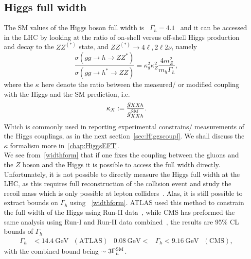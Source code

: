 \subsection{Higgs full width}
The SM values of the Higgs boson full width is ~$\Gamma_h=4.1$ \GeV\, and it can be accessed in the LHC by looking at the ratio of on-shell versus off-shell Higgs production and decay to the $ZZ^{(*)}$ state, and $ZZ^{(*)}\to 4 \ell, 2 \ell 2 \nu$, namely
\begin{equation}
\frac{\sigma(gg \to h\to Z Z^*)}{\sigma(gg \to h^*\to Z Z)} = \kappa_g^2 \kappa_Z^2 \frac{4 m_Z^2}{m_h \Gamma_h},
\label{widthform}
\end{equation}
where the $\kappa$ here denote the ratio between the measured/ or modified coupling with the Higgs and the SM prediction, i.e.
\begin{equation}
\kappa_X := \frac{g_{XX h}}{g_{XXh}^{\mathrm{SM}}}.
\label{kappa}
\end{equation}
Which is commonly used in reporting experimental constrains/ measurements of the Higgs couplings, as in the next section~\autoref{sec:Higgscoupl}. We shall discuss the $\kappa$ formalism more in~\autoref{chap:HiggsEFT}. \\ We see from~\eqref{widthform} that if one fixes the coupling between the gluons and the $Z$ boson and the Higgs it is possible to access the full width directly.  Unfortunately, it is not possible to directly measure the Higgs full width at the LHC, as this requires full reconstruction of the collision event and study the recoil mass which is only possible at lepton colliders~\cite{DeBlas:2019qco,Banerjee:2021huv}. 
Alas, it is still possible to extract bounds on $\Gamma_h$ using ~\eqref{widthform}. ATLAS used this method to constrain the full width of the Higgs using Run-II data~\cite{ATLAS:2018jym}, while CMS has preformed the same analysis using Run-I and Run-II data combined~\cite{CMS:2019ekd}, the results are 95\% CL bounds of $\Gamma_h$
\begin{align}
\Gamma_h &< \SI{14.4}{\giga\electronvolt} \,\,\,\, (\text{ATLAS}) & \SI{0.08}{\giga\electronvolt} <&\Gamma_h < \SI{9.16}{\giga\electronvolt}  \,\,\,\, (\text{CMS}),
\end{align}
with the combined bound being  $\sim 3 \Gamma_h^{\mathrm{SM}}$. 

